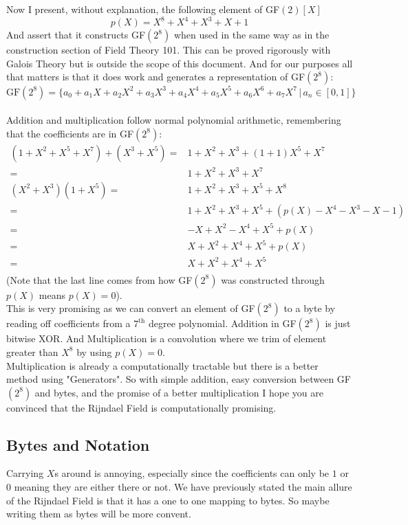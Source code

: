 Now I present, without explanation, the following element of GF$(2)[X]$
\[p(X) = X^8+X^4+X^3+X+1\]
And assert that it constructs GF$(2^8)$ when used in the same way as in the construction section of Field Theory 101.
This can be proved rigorously with Galois Theory but is outside the scope of this document.
And for our purposes all that matters is that it does work and generates a representation of GF$(2^8)$:
\[\text{GF}(2^8) = \{a_0 + a_1X+a_2X^2+a_3X^3+a_4X^4+a_5X^5+a_6X^6+a_7X^7\,|\,a_n\in[0,1]\}\]
\\

Addition and multiplication follow normal polynomial arithmetic,
remembering that the coefficients are in GF$(2^8)$:
\begin{equation*}
\begin{aligned}
	(1+X^2+X^5+X^7) + (X^3+X^5) =& 1+X^2 +X^3+(1+1)X^5+X^7\\
	=& 1+X^2 +X^3 +X^7\\
	(X^2+X^3) (1+X^5) =& 1+X^2+X^3+X^5+X^8 \\
	=& 1+X^2+X^3+X^5+(p(X)-X^4-X^3-X-1) \\
	=& -X+X^2-X^4+X^5+p(X) \\
	=& X+X^2+X^4+X^5+p(X) \\
	=& X+X^2+X^4+X^5 \\
\end{aligned}
\end{equation*}
(Note that the last line comes from how GF$(2^8)$ was constructed through $p(X)$ means $p(X) = 0$).
\\

This is very promising as we can convert an element of GF$(2^8)$ to a byte by reading off coefficients from a $7^\text{th}$ degree polynomial.
Addition in GF$(2^8)$ is just bitwise XOR.
And Multiplication is a convolution where we trim of element greater than $X^8$ by using $p(X)=0$. 
\\

Multiplication is already a computationally tractable but there is a better method using "Generators".
So with simple addition, easy conversion between GF$(2^8)$ and bytes, and the promise of a better multiplication I hope you are convinced that the Rijndael Field is computationally promising.

\subsection{Bytes and Notation}
\label{theory:byte}
Carrying $X$s around is annoying, 
especially since the coefficients can only be $1$ or $0$ meaning they are either there or not.
We have previously stated the main allure of the Rijndael Field is that it has a one to one mapping to bytes.
So maybe writing them as bytes will be more convent.

